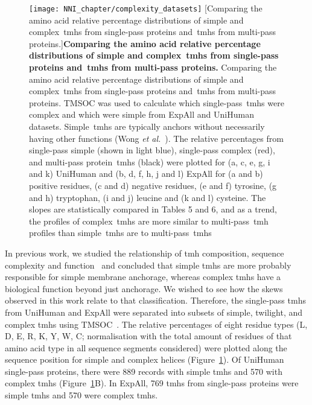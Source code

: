 \begin{figure}[p]
\centering
\texttt{[image: NNI\_chapter/complexity\_datasets]}
[Comparing the amino acid relative percentage distributions of simple and complex~\gls{tmh}s from single-pass proteins and~\gls{tmh}s from multi-pass proteins.]{\textbf{Comparing the amino acid relative percentage distributions of simple and complex~\gls{tmh}s from single-pass proteins and~\gls{tmh}s from multi-pass proteins.} Comparing the amino acid relative percentage distributions of simple and complex~\gls{tmh}s from single-pass proteins and~\gls{tmh}s from multi-pass proteins.
TMSOC was used to calculate which single-pass~\gls{tmh}s were complex and which were simple from ExpAll and UniHuman datasets.
Simple~\gls{tmh}s are typically anchors without necessarily having other functions (Wong \textit{et al.}~\cite{Wong2010}).
The relative percentages from single-pass simple (shown in light blue), single-pass complex (red), and multi-pass protein~\gls{tmh}s (black) were plotted for (a, c, e, g, i and k) UniHuman and (b, d, f, h, j and l) ExpAll for (a and b) positive residues, (c and d) negative residues, (e and f) tyrosine, (g and h) tryptophan, (i and j) leucine and (k and l) cysteine.
The slopes are statistically compared in Tables 5 and 6, and as a trend, the profiles of complex~\gls{tmh}s are more similar to multi-pass~\gls{tmh} profiles than simple~\gls{tmh}s are to multi-pass~\gls{tmh}s}

\label{fig:complexity_datasets}
\end{figure}

In previous work, we studied the relationship of \gls{tmh} composition, sequence complexity and function~\cite{Wong2010, Wong2011, Wong2012} and concluded that simple \gls{tmh}s are more probably responsible for simple membrane anchorage, whereas complex \gls{tmh}s have a biological function beyond just anchorage.
We wished to see how the skews observed in this work relate to that classification.
Therefore, the single-pass \gls{tmh}s from UniHuman and ExpAll were separated into subsets of simple, twilight, and complex \gls{tmh}s using TMSOC~\cite{Wong2011, Wong2012}.
The relative percentages of eight residue types (L, D, E, R, K, Y, W, C\@; normalisation with the total amount of residues of that amino acid type in all sequence segments considered) were plotted along the sequence position for simple and complex helices (Figure~\ref{fig:complexity_datasets}).
Of UniHuman single-pass proteins, there were 889 records with simple \gls{tmh}s and 570 with complex \gls{tmh}s (Figure~\ref{fig:complexity_datasets}B).
In ExpAll, 769 \gls{tmh}s from single-pass proteins were simple \gls{tmh}s and 570 were complex \gls{tmh}s.

